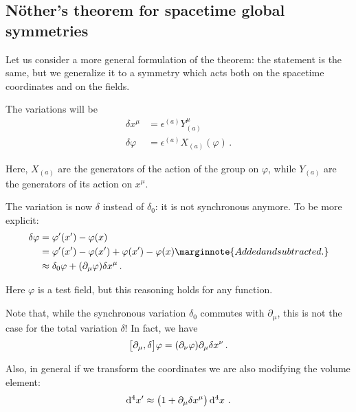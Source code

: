 \documentclass[main.tex]{subfiles}
\begin{document}
\subsection{Nöther's theorem for spacetime global symmetries}

Let us consider a more general formulation of the theorem: the statement is the same, but we generalize it to a symmetry which acts both on the spacetime coordinates and on the fields. 

The variations will be 
%
\begin{subequations}
\begin{align}
\delta {x^{\mu }} &= \epsilon^{(a)} Y_{(a)}^{\mu }  \\
\delta \varphi &= \epsilon^{(a)} X_{(a)}(\varphi )
\,.
\end{align}
\end{subequations}

Here, \(X_{(a)}\) are the generators of the action of the group on \(\varphi \), while \(Y_{(a)}\) are the generators of its action on \(x^{\mu }\). 

The variation is now \(\delta \) instead of \(\delta_0 \): it is not synchronous anymore. To be more explicit: 
%
\begin{subequations}
\begin{align}
\delta \varphi &= \varphi' (x') - \varphi (x)  \\
&= \varphi ' (x') - \varphi (x') + \varphi (x') - \varphi (x)  \marginnote{Added and subtracted.}\\
&\approx  \delta_0 \varphi + (\partial_{\mu } \varphi ) \delta x^{\mu }
\,.
\end{align}
\end{subequations}

Here \(\varphi \) is a test field, but this reasoning holds for any function. 

Note that, while the synchronous variation \(\delta_0\) commutes with \(\partial_{\mu }\), this is not the case for the total variation \(\delta \)! In fact, we have 
%
\begin{align}
\qty[\partial_{\mu }, \delta ] \varphi = \qty(\partial_{\nu } \varphi ) \partial_{\mu } \delta x^{\nu }
\,.
\end{align}

Also, in general if we transform the coordinates we are also modifying the volume element: 
%
\begin{align}
\dd[4]{x'} \approx \qty(1 + \partial_{\mu } \delta x^{\mu }) \dd[4]{x}
\,.
\end{align}
\end{document}
